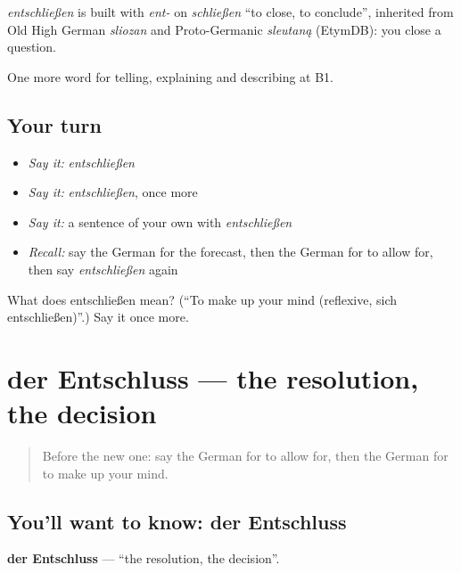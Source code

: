 \begin{cousinweb}
\emph{entschließen} is built with \emph{ent-} on \emph{schließen} \textquotedblleft{}to close, to conclude\textquotedblright{}, inherited from Old High German \emph{sliozan} and Proto-Germanic \emph{sleutaną} (EtymDB): you close a question.
\end{cousinweb}

\begin{grammarlens}[title={What you've built}]
One more word for telling, explaining and describing at B1.
\end{grammarlens}

\subsection*{Your turn}
\begin{itemize}
\raggedright
  \item \emph{Say it:} \emph{entschließen}
  \item \emph{Say it:} \emph{entschließen}, once more
  \item \emph{Say it:} a sentence of your own with \emph{entschließen}
  \item \emph{Recall:} say the German for the forecast, then the German for to allow for, then say \emph{entschließen} again
\end{itemize}

\begin{tcolorbox}[breakable,colback=teal!4,colframe=teal!35!black,title={Before you move on}]
What does entschließen mean? (\textquotedblleft{}To make up your mind (reflexive, sich entschließen)\textquotedblright{}.) Say it once more.
\end{tcolorbox}
\section[der Entschluss]{der Entschluss — the resolution, the decision}

\label{lesson:GE-C374-entschluss}



\begin{quote}
Before the new one: say the German for to allow for, then the German for to make up your mind.
\end{quote}

\subsection*{You'll want to know: der Entschluss}
\textbf{der Entschluss} — \textquotedblleft{}the resolution, the decision\textquotedblright{}.

